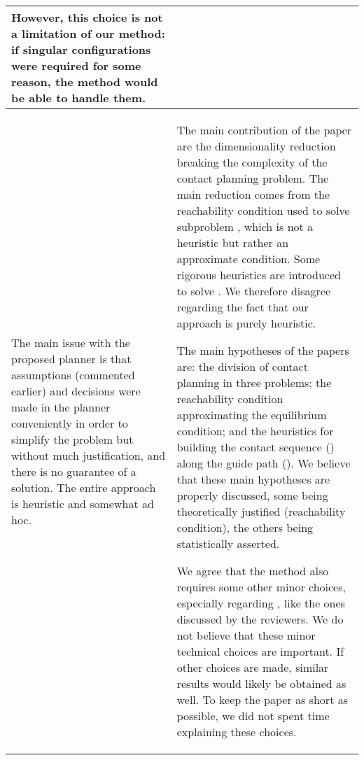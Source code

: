 \documentclass[a4paper]{article}
\begin{document}
\begin{longtable}{|p{21em}|p{21em}|}
However, this choice is not a limitation of our method: if singular configurations were required for some reason, the method would be able
to handle them.

\\ \hline %
The main issue with the proposed planner is that assumptions (commented earlier) and decisions were made in the planner conveniently in order to simplify the problem but without much justification, and there is no guarantee of a solution. The entire approach is heuristic and somewhat ad hoc. 
&
The main contribution of the paper are the dimensionality reduction breaking the complexity of the contact planning problem.
The main reduction comes from the reachability condition used to solve subproblem \mP1, which is not a heuristic but rather an approximate condition.
Some rigorous heuristics are introduced to solve \mP2.
We therefore disagree regarding the fact that our approach is purely heuristic.

The main hypotheses of the papers are: the division of contact planning in three problems; the reachability condition approximating the equilibrium condition; and the heuristics for building the contact sequence (\mP2) along the guide path (\mP1).
We believe that these main hypotheses are properly discussed, some being theoretically justified (reachability condition), the others being statistically asserted.


We agree that the method also requires some other minor choices, especially regarding \mP2, like the ones discussed by the reviewers. 
We do not believe that these minor technical choices are important. 
If other choices are made, similar results would likely be obtained as well.
To keep the paper as short as possible, we did not spent time explaining these choices.


\end{longtable}
\end{document}
